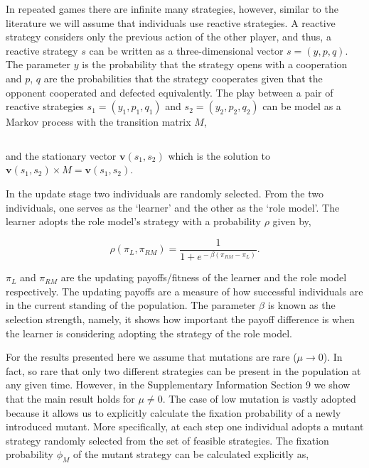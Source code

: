 \documentclass[11pt]{article}
\theoremstyle{plainCl1}
\theoremstyle{plainCl2}
\begin{document}
In repeated games there are infinite many strategies, however, similar to the
literature we will assume that individuals use reactive strategies. A reactive
strategy considers only the previous action of the other player, and thus, a
reactive strategy \(s\) can be written as a three-dimensional vector \(s=(y, p,
q)\). The parameter \(y\) is the probability that the strategy opens with a
cooperation and \(p\), \(q\) are the probabilities that the strategy cooperates
given that the opponent cooperated and defected equivalently. The play between a
pair of reactive strategies $s_1 = (y_1, p_1, q_1)$ and $s_2 = (y_2, p_2, q_2)$
can be model as a Markov process with the transition matrix \(M\),

\begin{equation}\label{eq:transition_matrix}
  
\end{equation}

and the stationary vector \(\mathbf{v}(s_1,s_2)\)
which is the solution to \(\mathbf{v}(s_1,s_2) \times M 
= \mathbf{v}(s_1,s_2)\).

In the update stage two individuals are randomly selected. From the two
individuals, one  serves as the `learner' and the other as the `role model'. The
learner adopts the role model's strategy with a probability \(\rho\) given by,

\begin{equation} \label{Eq:rho}
    \rho(\pi_{L}, \pi_{RM}) = \frac{1}{1\!+\! e^{\!-\!\beta (\pi_{RM}\!-\! \pi_{L})}}.
\end{equation}

\(\pi_{L}\) and \(\pi_{RM}\) are the updating payoffs/fitness of the learner and the
role model respectively. The updating payoffs are a measure of how successful
individuals are in the current standing of the population. The parameter
\(\beta\) is known as the selection strength, namely, it shows how important the
payoff difference is when the learner is considering adopting the strategy of
the role model.

For the results presented here we assume that mutations are rare (\(\mu
\rightarrow 0\)). In fact, so rare that only two different strategies can be
present in the population at any given time. However, in the Supplementary Information
Section 9 we show that the main result holds for \(\mu \neq 0\).
The case of low mutation is vastly adopted because it allows us to explicitly
calculate the fixation probability of a newly introduced mutant. More specifically,
at each step
one individual adopts a mutant strategy randomly selected from the set of
feasible strategies. The fixation probability \(\phi_{M}\) of the mutant
strategy can be calculated explicitly as,
\end{document}
